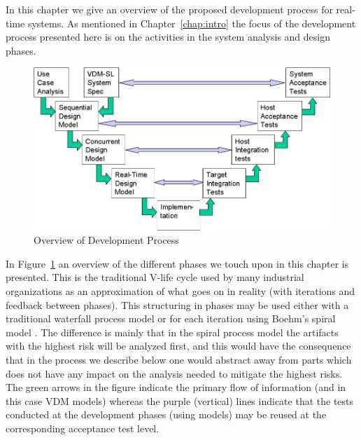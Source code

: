 \documentclass{overturerepchap}
\begin{document}
In this chapter we give an overview of the proposed development
process for real-time systems. As mentioned in
Chapter~\ref{chap:intro} the focus of the development process
presented here is on the activities in the system analysis and design phases.

\begin{figure}
\begin{center}
\includegraphics[width=\textwidth]{figures/lifecycle.jpg}
\end{center}






\caption{Overview of Development Process}\label{fig:processoverview}
\end{figure}

In Figure~\ref{fig:processoverview} an overview of the different
phases we touch upon in this chapter is presented. This is the
traditional V-life cycle used by many industrial organizations as
an approximation of what goes on in reality (with iterations and feedback
between phases).  This
structuring in phases may be used either with a traditional waterfall
process model or for each iteration using Boehm's spiral model
\cite{Sommerville82, Boehm88}.  The difference is mainly that in the
spiral process model the artifacts with the highest risk will be
analyzed first, and this would have the consequence that in the
process we describe below one would abstract away from parts which
does not have any impact on the analysis needed to mitigate the
highest risks. The green arrows in the figure indicate the primary flow of 
information (and in this case VDM models) whereas the purple (vertical) lines
indicate that the tests conducted at the development phases (using models)
may be reused at the corresponding acceptance test level.
\end{document}
